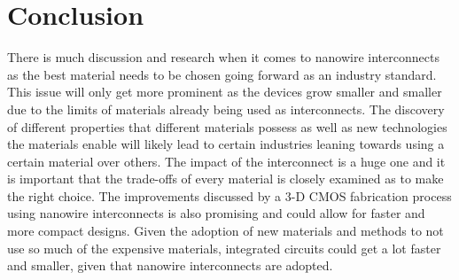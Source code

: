 \documentclass[conference]{IEEEtran}
\begin{document}
\section{Conclusion}
There is much discussion and research when it comes to nanowire interconnects as
the best material needs to be chosen going forward as an industry standard. This
issue will only get more prominent as the devices grow smaller and smaller due
to the limits of materials already being used as interconnects. The discovery of
different properties that different materials possess as well as new technologies
the materials enable will likely lead to certain industries leaning towards using
a certain material over others. The impact of the interconnect is a huge one and it is important
that the trade-offs of every material is closely examined as to make the right choice.
The improvements discussed by a 3-D CMOS fabrication process using nanowire interconnects
is also promising and could allow for faster and more compact designs. Given the adoption
of new materials and methods to not use so much of the expensive materials, integrated
circuits could get a lot faster and smaller, given that nanowire interconnects are adopted.


\end{document}
